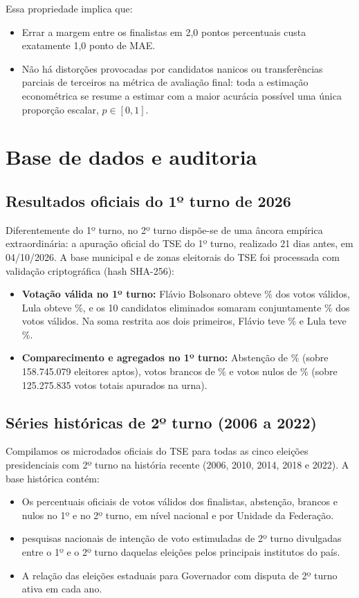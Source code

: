 \documentclass[10.5pt,a4paper]{article}
\begin{document}
Essa propriedade implica que:
\begin{itemize}
    \item Errar a margem entre os finalistas em 2,0 pontos percentuais custa exatamente 1,0 ponto de MAE.
    \item Não há distorções provocadas por candidatos nanicos ou transferências parciais de terceiros na métrica de avaliação final: toda a estimação econométrica se resume a estimar com a maior acurácia possível uma única proporção escalar, $p \in [0, 1]$.
\end{itemize}

\section{Base de dados e auditoria}

\subsection{Resultados oficiais do 1º turno de 2026}
Diferentemente do 1º turno, no 2º turno dispõe-se de uma âncora empírica extraordinária: a apuração oficial do TSE do 1º turno, realizado 21 dias antes, em 04/10/2026. A base municipal e de zonas eleitorais do TSE foi processada com validação criptográfica (hash SHA-256):
\begin{itemize}
    \item \textbf{Votação válida no 1º turno:} Flávio Bolsonaro obteve \flavioUmT\% dos votos válidos, Lula obteve \lulaUmT\%, e os 10 candidatos eliminados somaram conjuntamente \tercUmT\% dos votos válidos. Na soma restrita aos dois primeiros, Flávio teve \flavioDoisCand\% e Lula teve \lulaDoisCand\%.
    \item \textbf{Comparecimento e agregados no 1º turno:} Abstenção de \abstUmT\% (sobre 158.745.079 eleitores aptos), votos brancos de \brancosUmT\% e votos nulos de \nulosUmT\% (sobre 125.275.835 votos totais apurados na urna).
\end{itemize}

\subsection{Séries históricas de 2º turno (2006 a 2022)}
Compilamos os microdados oficiais do TSE para todas as cinco eleições presidenciais com 2º turno na história recente (2006, 2010, 2014, 2018 e 2022). A base histórica contém:
\begin{itemize}
    \item Os percentuais oficiais de votos válidos dos finalistas, abstenção, brancos e nulos no 1º e no 2º turno, em nível nacional e por Unidade da Federação.
    \item \nHist{} pesquisas nacionais de intenção de voto estimuladas de 2º turno divulgadas entre o 1º e o 2º turno daquelas eleições pelos principais institutos do país.
    \item A relação das eleições estaduais para Governador com disputa de 2º turno ativa em cada ano.
\end{itemize}
\end{document}
